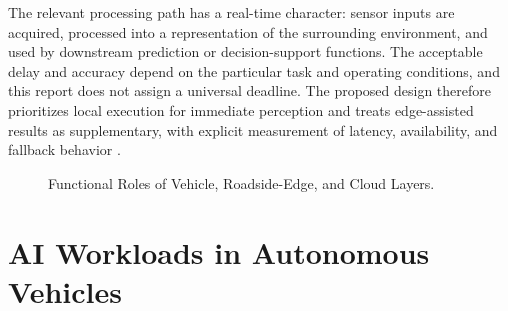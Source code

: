 \documentclass[12pt,a4paper,oneside]{report}
\begin{document}
The relevant processing path has a real-time character: sensor inputs are
acquired, processed into a representation of the surrounding environment,
and used by downstream prediction or decision-support functions. The
acceptable delay and accuracy depend on the particular task and operating
conditions, and this report does not assign a universal deadline. The
proposed design therefore prioritizes local execution for immediate
perception and treats edge-assisted results as supplementary, with explicit
measurement of latency, availability, and fallback behavior
\cite{biswas2023,v2xvit2022,v2xsurvey2025}.

\begin{figure}[H]
  \centering
  \caption{Functional Roles of Vehicle, Roadside-Edge, and Cloud Layers.}
  \label{fig:vehicle-edge-cloud-overview}
\end{figure}

\section{AI Workloads in Autonomous Vehicles}
\end{document}
